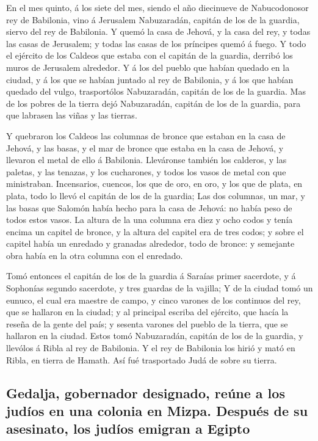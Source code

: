  En el mes quinto, á los siete del mes, siendo el año
diecinueve de Nabucodonosor rey de Babilonia, vino á Jerusalem
Nabuzaradán, capitán de los de la guardia, siervo del rey de Babilonia.
 Y quemó la casa de Jehová, y la casa del rey, y todas las
casas de Jerusalem; y todas las casas de los príncipes quemó á fuego.
 Y todo el ejército de los Caldeos que estaba con el
capitán de la guardia, derribó los muros de Jerusalem alrededor.
 Y á los del pueblo que habían quedado en la ciudad, y á
los que se habían juntado al rey de Babilonia, y á los que habían
quedado del vulgo, trasportólos Nabuzaradán, capitán de los de la
guardia.  Mas de los pobres de la tierra dejó
Nabuzaradán, capitán de los de la guardia, para que labrasen las viñas y
las tierras.

 Y quebraron los Caldeos las columnas de bronce que
estaban en la casa de Jehová, y las basas, y el mar de bronce que estaba
en la casa de Jehová, y llevaron el metal de ello á Babilonia.
 Lleváronse también los calderos, y las paletas, y las
tenazas, y los cucharones, y todos los vasos de metal con que
ministraban.  Incensarios, cuencos, los que de oro, en
oro, y los que de plata, en plata, todo lo llevó el capitán de los de la
guardia;  Las dos columnas, un mar, y las basas que
Salomón había hecho para la casa de Jehová: no había peso de todos estos
vasos.  La altura de la una columna era diez y ocho codos
y tenía encima un capitel de bronce, y la altura del capitel era de tres
codos; y sobre el capitel había un enredado y granadas alrededor, todo
de bronce: y semejante obra había en la otra columna con el enredado.

 Tomó entonces el capitán de los de la guardia á Saraías
primer sacerdote, y á Sophonías segundo sacerdote, y tres guardas de la
vajilla;  Y de la ciudad tomó un eunuco, el cual era
maestre de campo, y cinco varones de los continuos del rey, que se
hallaron en la ciudad; y al principal escriba del ejército, que hacía la
reseña de la gente del país; y sesenta varones del pueblo de la tierra,
que se hallaron en la ciudad.  Estos tomó Nabuzaradán,
capitán de los de la guardia, y llevólos á Ribla al rey de Babilonia.
 Y el rey de Babilonia los hirió y mató en Ribla, en
tierra de Hamath. Así fué trasportado Judá de sobre su tierra.

\hypertarget{gedalja-gobernador-designado-reuxfane-a-los-juduxedos-en-una-colonia-en-mizpa.-despuuxe9s-de-su-asesinato-los-juduxedos-emigran-a-egipto}{%
\subsection{Gedalja, gobernador designado, reúne a los judíos en una
colonia en Mizpa. Después de su asesinato, los judíos emigran a
Egipto}\label{gedalja-gobernador-designado-reuxfane-a-los-juduxedos-en-una-colonia-en-mizpa.-despuuxe9s-de-su-asesinato-los-juduxedos-emigran-a-egipto}}

